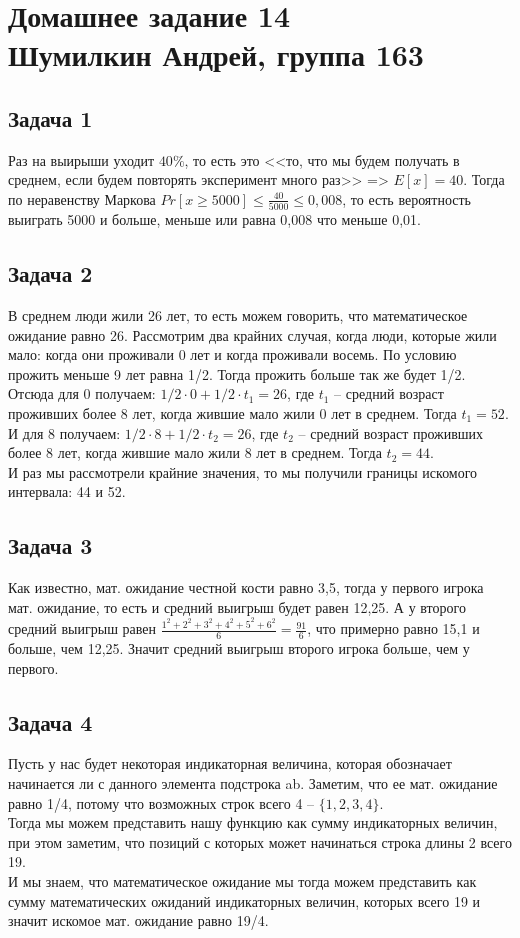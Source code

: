 

	\section{Домашнее задание 14\\ Шумилкин Андрей, группа 163} 
	\subsection{Задача 1}
	Раз на выирыши уходит $40\%$, то есть это <<то, что мы будем получать в среднем, если будем повторять эксперимент много раз>> => $E[x] = 40 $. Тогда по неравенству Маркова $Pr[x \ge 5000] \le \frac{40}{5000} \le 0,008$, то есть вероятность выиграть 5000 и больше, меньше или равна 0,008 что меньше 0,01.
	
	\subsection{Задача 2}
	В среднем люди жили 26 лет, то есть можем говорить, что математическое ожидание равно 26.
	Рассмотрим два крайних случая, когда люди, которые жили мало: когда они проживали 0 лет и когда проживали восемь. По условию прожить меньше 9 лет равна 1/2. Тогда прожить больше так же будет 1/2. \\
	Отсюда для 0 получаем: $1/2 \cdot 0 + 1/2 \cdot t_1 = 26$, где $t_1$ -- средний возраст проживших более 8 лет, когда жившие мало жили 0 лет в среднем. Тогда $t_1 = 52$. \\
	И для 8 получаем: $1/2 \cdot 8 + 1/2 \cdot t_2 = 26$, где $t_2$ -- средний возраст проживших более 8 лет, когда жившие мало жили 8 лет в среднем. Тогда $t_2 = 44$.\\
	И раз мы рассмотрели крайние значения, то мы получили границы искомого интервала: 44 и 52. 
	
	\subsection{Задача 3}
	Как известно, мат. ожидание честной кости равно 3,5, тогда у первого игрока мат. ожидание, то есть и средний выигрыш будет равен 12,25. А у второго средний выигрыш равен $\frac{1^2 + 2^2 + 3^2 + 4^2 + 5^2 + 6^2}{6} = \frac{91}{6}$, что примерно равно 15,1 и больше, чем 12,25.
	Значит средний выигрыш второго игрока больше, чем у первого.
	
	\subsection{Задача 4}
	Пусть у нас будет некоторая индикаторная величина, которая обозначает начинается ли с данного элемента подстрока ab. Заметим, что ее мат. ожидание равно 1/4, потому что возможных строк всего 4 -- $\{1, 2, 3, 4\}$. \\
	Тогда мы можем представить нашу функцию как сумму индикаторных величин, при этом заметим, что позиций с которых может начинаться строка длины 2 всего 19. \\
	И мы знаем, что математическое ожидание мы тогда можем представить как сумму математических ожиданий индикаторных величин, которых всего 19 и значит искомое мат. ожидание равно 19/4.
	
